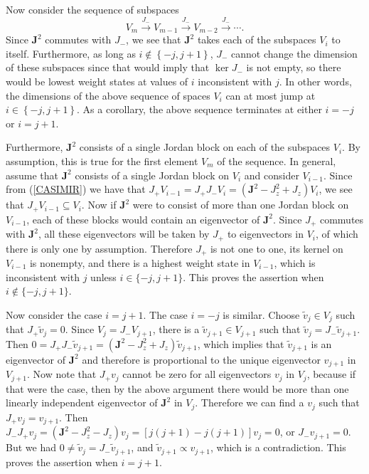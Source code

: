 \documentclass[a4paper,dvips,12pt]{article}
\begin{document}
    Now consider the sequence of subspaces
    \[
        V_m \stackrel{J_-}{\longrightarrow} V_{m-1} \stackrel{J_-}{\longrightarrow}
        V_{m-2} \stackrel{J_-}{\longrightarrow} \cdots.
    \]
    Since $\mathbf{J}^2$ commutes with $J_-$, we see that
    $\mathbf{J}^2$ takes each of the subspaces $V_{i}$ to
    itself.  Furthermore, as long as $i \not\in \left\{-j, j + 1\right\}$, $J_-$
    cannot change the dimension of these subspaces since that
    would imply that $\ker J_-$ is not empty, so there would be
    lowest weight states at values of $i$ inconsistent with $j$.
    In other words, the dimensions of the above sequence of spaces
    $V_i$ can at most jump at $i \in \left\{-j, j + 1\right\}$.
    As a corollary, the above sequence terminates at either $i =
    -j$ or $i = j + 1$.

    Furthermore, $\mathbf{J}^2$ consists of a single
    Jordan block on each of the subspaces $V_i$.
    By assumption, this is true for the first element $V_m$
    of the sequence.  In general, assume that $\mathbf{J}^2$ consists of a
    single Jordan block on $V_i$ and consider $V_{i-1}$.  Since from (\ref{CASIMIR})
    we have that $J_+ V_{i-1} = J_+ J_- V_i = (\mathbf{J}^2 - J_z^2 +
    J_z) V_i$, we see that $J_+ V_{i-1} \subseteq V_i$.  Now if $\mathbf{J}^2$
    were to consist of more than one Jordan block on $V_{i-1}$, each
    of these blocks would contain an eigenvector of $\mathbf{J}^2$.
    Since $J_+$ commutes with $\mathbf{J}^2$, all these
    eigenvectors will be taken by $J_+$ to eigenvectors in $V_i$,
    of which there is only one by assumption.
    Therefore $J_+$ is not one to one, its
    kernel on $V_{i-1}$ is nonempty, and there is a highest weight
    state in $V_{i-1}$, which is inconsistent with $j$ unless
    $i \in \{-j, j+1\}$.  This proves the assertion when
    $i \not\in \{-j, j+1\}$.

    Now consider the case $i = j + 1$.  The case $i = -j$ is similar.
    Choose $\tilde v_{j}\in V_{j}$ such
    that $J_+ \tilde v_{j} = 0$.  Since $V_{j} = J_- V_{j+1}$,
    there is a $\tilde v_{j+1}\in V_{j+1}$ such that $\tilde v_{j} = J_- \tilde
    v_{j+1}$.  Then $0 = J_+ J_- \tilde v_{j+1} = (\mathbf{J}^2 - J_z^2 + J_z)
    \tilde v_{j+1}$, which implies that $\tilde v_{j+1}$ is an eigenvector of
    $\mathbf{J}^2$ and therefore is proportional to
    the unique eigenvector $v_{j+1}$ in $V_{j+1}$.
    Now note that $J_+ v_{j}$ cannot be zero for all eigenvectors $v_{j}$ in
    $V_{j}$, because if that were the case, then by the
    above argument there would be more than one linearly independent eigenvector of
    $\mathbf{J}^2$ in $V_{j}$.  Therefore we can find a $v_{j}$ such that $J_+ v_{j} =
    v_{j+1}$.
    Then $J_- J_+ v_{j} = (\mathbf{J}^2 - J_z^2 - J_z) v_{j}
    = \left[j(j+1) - j(j+1)\right] v_j = 0$,
    or $J_- v_{j+1} = 0$.  But we had $0\ne\tilde v_j = J_- \tilde
    v_{j+1}$, and $\tilde v_{j+1} \propto v_{j+1}$, which is a
    contradiction.  This proves the assertion when $i = j + 1$.
\end{document}
